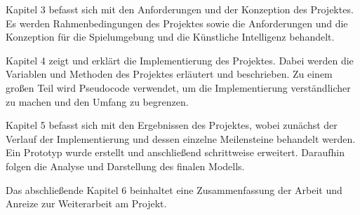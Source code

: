 Kapitel 3 befasst sich mit den Anforderungen und der Konzeption des Projektes. Es werden Rahmenbedingungen des Projektes sowie die Anforderungen und die Konzeption für die Spielumgebung und die Künstliche Intelligenz behandelt.

Kapitel 4 zeigt und erklärt die Implementierung des Projektes. Dabei werden die Variablen und Methoden des Projektes erläutert und beschrieben. Zu einem großen Teil wird Pseudocode verwendet, um die Implementierung verständlicher zu machen und den Umfang zu begrenzen.

Kapitel 5 befasst sich mit den Ergebnissen des Projektes, wobei zunächst der Verlauf der Implementierung und dessen einzelne Meilensteine behandelt werden. Ein Prototyp wurde erstellt und anschließend schrittweise erweitert. Daraufhin folgen die Analyse und Darstellung des finalen Modells.

Das abschließende Kapitel 6 beinhaltet eine Zusammenfassung der Arbeit und Anreize zur Weiterarbeit am Projekt.
